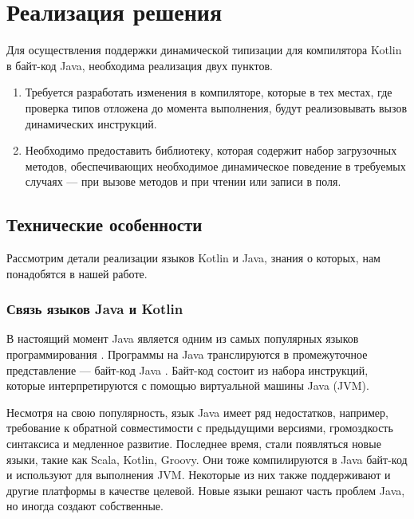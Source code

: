 \section{Реализация решения}

Для осуществления поддержки динамической типизации для компилятора Kotlin в байт-код Java, необходима реализация двух пунктов.

\begin{enumerate}
    \item Требуется разработать изменения в компиляторе, которые в тех местах, где проверка типов отложена до момента выполнения, будут реализовывать вызов динамических инструкций.
    \item Необходимо предоставить библиотеку, которая содержит набор загрузочных методов, обеспечивающих необходимое динамическое поведение в требуемых случаях --- при вызове методов и при чтении или записи в поля.
\end{enumerate}




\subsection{Технические особенности}

Рассмотрим детали реализации языков Kotlin и Java, знания о которых, нам понадобятся в нашей работе.

\subsubsection{Связь языков Java и Kotlin}
\label{sec:connectKotlinWithJava}

В настоящий момент Java является одним из самых популярных языков программирования \cite{online:TIOBELanguageIndex}. Программы на Java транслируются в промежуточное представление --- байт-код Java \cite{book:yellin1996java}. Байт-код состоит из набора инструкций, которые интерпретируются с помощью виртуальной машины Java (JVM).

Несмотря на свою популярность, язык Java имеет ряд недостатков, например, требование к обратной совместимости с предыдущими версиями, громоздкость синтаксиса и медленное развитие. Последнее время, стали появляться новые языки, такие как Scala, Kotlin, Groovy. Они тоже компилируются в Java байт-код и используют для выполнения JVM. Некоторые из них также поддерживают и другие платформы в качестве целевой. Новые языки решают часть проблем Java, но иногда создают собственные.
    
